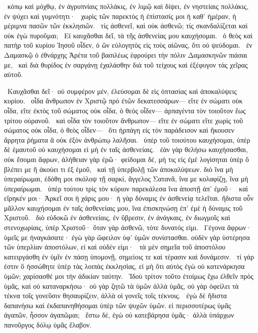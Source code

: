 ~κόπῳ καὶ μόχθῳ, ἐν ἀγρυπνίαις πολλάκις, ἐν λιμῷ καὶ δίψει, ἐν νηστείαις πολλάκις, ἐν ψύχει καὶ γυμνότητι·
~χωρὶς τῶν παρεκτὸς ἡ ἐπίστασίς μοι ἡ καθ’ ἡμέραν, ἡ μέριμνα πασῶν τῶν ἐκκλησιῶν.
~τίς ἀσθενεῖ, καὶ οὐκ ἀσθενῶ; τίς σκανδαλίζεται καὶ οὐκ ἐγὼ πυροῦμαι;
~Εἰ καυχᾶσθαι δεῖ, τὰ τῆς ἀσθενείας μου καυχήσομαι.
~ὁ θεὸς καὶ πατὴρ τοῦ κυρίου Ἰησοῦ οἶδεν, ὁ ὢν εὐλογητὸς εἰς τοὺς αἰῶνας, ὅτι οὐ ψεύδομαι.
~ἐν Δαμασκῷ ὁ ἐθνάρχης Ἁρέτα τοῦ βασιλέως ἐφρούρει τὴν πόλιν Δαμασκηνῶν πιάσαι με,
~καὶ διὰ θυρίδος ἐν σαργάνῃ ἐχαλάσθην διὰ τοῦ τείχους καὶ ἐξέφυγον τὰς χεῖρας αὐτοῦ.

~Καυχᾶσθαι δεῖ· οὐ συμφέρον μέν, ἐλεύσομαι δὲ εἰς ὀπτασίας καὶ ἀποκαλύψεις κυρίου.
~οἶδα ἄνθρωπον ἐν Χριστῷ πρὸ ἐτῶν δεκατεσσάρων— εἴτε ἐν σώματι οὐκ οἶδα, εἴτε ἐκτὸς τοῦ σώματος οὐκ οἶδα, ὁ θεὸς οἶδεν— ἁρπαγέντα τὸν τοιοῦτον ἕως τρίτου οὐρανοῦ.
~καὶ οἶδα τὸν τοιοῦτον ἄνθρωπον— εἴτε ἐν σώματι εἴτε χωρὶς τοῦ σώματος οὐκ οἶδα, ὁ θεὸς οἶδεν—
~ὅτι ἡρπάγη εἰς τὸν παράδεισον καὶ ἤκουσεν ἄρρητα ῥήματα ἃ οὐκ ἐξὸν ἀνθρώπῳ λαλῆσαι.
~ὑπὲρ τοῦ τοιούτου καυχήσομαι, ὑπὲρ δὲ ἐμαυτοῦ οὐ καυχήσομαι εἰ μὴ ἐν ταῖς ἀσθενείαις.
~ἐὰν γὰρ θελήσω καυχήσασθαι, οὐκ ἔσομαι ἄφρων, ἀλήθειαν γὰρ ἐρῶ· φείδομαι δέ, μή τις εἰς ἐμὲ λογίσηται ὑπὲρ ὃ βλέπει με ἢ ἀκούει τι ἐξ ἐμοῦ,
~καὶ τῇ ὑπερβολῇ τῶν ἀποκαλύψεων. διὸ ἵνα μὴ ὑπεραίρωμαι, ἐδόθη μοι σκόλοψ τῇ σαρκί, ἄγγελος Σατανᾶ, ἵνα με κολαφίζῃ, ἵνα μὴ ὑπεραίρωμαι.
~ὑπὲρ τούτου τρὶς τὸν κύριον παρεκάλεσα ἵνα ἀποστῇ ἀπ’ ἐμοῦ·
~καὶ εἴρηκέν μοι· Ἀρκεῖ σοι ἡ χάρις μου· ἡ γὰρ δύναμις ἐν ἀσθενείᾳ τελεῖται. ἥδιστα οὖν μᾶλλον καυχήσομαι ἐν ταῖς ἀσθενείαις μου, ἵνα ἐπισκηνώσῃ ἐπ’ ἐμὲ ἡ δύναμις τοῦ Χριστοῦ.
~διὸ εὐδοκῶ ἐν ἀσθενείαις, ἐν ὕβρεσιν, ἐν ἀνάγκαις, ἐν διωγμοῖς καὶ στενοχωρίαις, ὑπὲρ Χριστοῦ· ὅταν γὰρ ἀσθενῶ, τότε δυνατός εἰμι.
~Γέγονα ἄφρων· ὑμεῖς με ἠναγκάσατε· ἐγὼ γὰρ ὤφειλον ὑφ’ ὑμῶν συνίστασθαι. οὐδὲν γὰρ ὑστέρησα τῶν ὑπερλίαν ἀποστόλων, εἰ καὶ οὐδέν εἰμι·
~τὰ μὲν σημεῖα τοῦ ἀποστόλου κατειργάσθη ἐν ὑμῖν ἐν πάσῃ ὑπομονῇ, σημείοις τε καὶ τέρασιν καὶ δυνάμεσιν.
~τί γάρ ἐστιν ὃ ἡσσώθητε ὑπὲρ τὰς λοιπὰς ἐκκλησίας, εἰ μὴ ὅτι αὐτὸς ἐγὼ οὐ κατενάρκησα ὑμῶν; χαρίσασθέ μοι τὴν ἀδικίαν ταύτην.
~Ἰδοὺ τρίτον τοῦτο ἑτοίμως ἔχω ἐλθεῖν πρὸς ὑμᾶς, καὶ οὐ καταναρκήσω· οὐ γὰρ ζητῶ τὰ ὑμῶν ἀλλὰ ὑμᾶς, οὐ γὰρ ὀφείλει τὰ τέκνα τοῖς γονεῦσιν θησαυρίζειν, ἀλλὰ οἱ γονεῖς τοῖς τέκνοις.
~ἐγὼ δὲ ἥδιστα δαπανήσω καὶ ἐκδαπανηθήσομαι ὑπὲρ τῶν ψυχῶν ὑμῶν. εἰ περισσοτέρως ὑμᾶς ἀγαπῶν, ἧσσον ἀγαπῶμαι;
~ἔστω δέ, ἐγὼ οὐ κατεβάρησα ὑμᾶς· ἀλλὰ ὑπάρχων πανοῦργος δόλῳ ὑμᾶς ἔλαβον.
